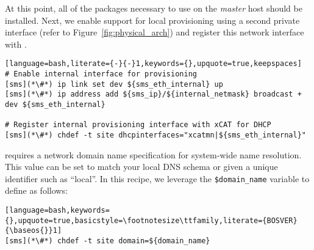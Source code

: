 At this point, all of the packages necessary to use \xCAT{} on the {\em master}
host should be installed. Next, we enable support for local provisioning using
a second private interface (refer to Figure~\ref{fig:physical_arch}) and
register this network interface with \xCAT{}.

\begin{lstlisting}[language=bash,literate={-}{-}1,keywords={},upquote=true,keepspaces]
# Enable internal interface for provisioning
[sms](*\#*) ip link set dev ${sms_eth_internal} up
[sms](*\#*) ip address add ${sms_ip}/${internal_netmask} broadcast + dev ${sms_eth_internal}

# Register internal provisioning interface with xCAT for DHCP
[sms](*\#*) chdef -t site dhcpinterfaces="xcatmn|${sms_eth_internal}"

\end{lstlisting}


\noindent \xCAT{} requires a network domain name specification for system-wide name
resolution. This value can be set to match your local DNS schema or given a
unique identifier such as ``local''. In this recipe, we leverage the
\texttt{\$domain\_name} variable to define as follows:

\begin{lstlisting}[language=bash,keywords={},upquote=true,basicstyle=\footnotesize\ttfamily,literate={BOSVER}{\baseos{}}1]
[sms](*\#*) chdef -t site domain=${domain_name}
\end{lstlisting}
